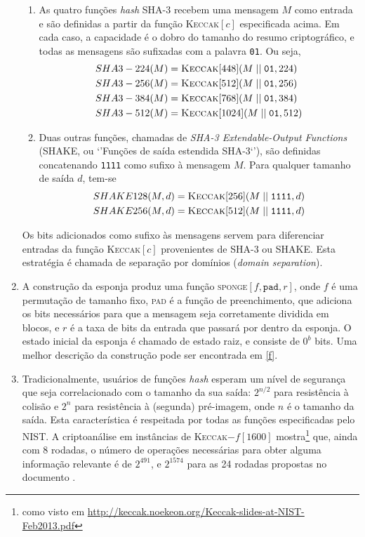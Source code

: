 \documentclass{article}
\begin{document}
\begin{enumerate}[label=(\alph*)]
\begin{enumerate}[label=\roman*.]

\item As quatro funções \emph{hash} SHA-3 recebem uma mensagem $M$ como entrada
e são definidas a partir da função \textsc{Keccak}$[c]$ especificada acima. Em
cada caso, a capacidade é o dobro do tamanho do resumo criptográfico, e todas
as mensagens são sufixadas com a palavra \texttt{01}. Ou seja,
\begin{align*}
    SHA3-224(M) &= \textsc{Keccak}[448](M \mid\mid \texttt{01}, 224) \\
    SHA3-256(M) &= \textsc{Keccak}[512](M \mid\mid \texttt{01}, 256) \\
    SHA3-384(M) &= \textsc{Keccak}[768](M \mid\mid \texttt{01}, 384) \\
    SHA3-512(M) &= \textsc{Keccak}[1024](M \mid\mid \texttt{01}, 512)
\end{align*}

\item Duas outras funções, chamadas de \emph{SHA-3 Extendable-Output Functions}
(SHAKE, ou `'Funções de saída estendida SHA-3`'), são definidas concatenando
\texttt{1111} como sufixo à mensagem $M$. Para qualquer tamanho de saída $d$,
tem-se
\begin{align*}
    SHAKE128(M, d) &= \textsc{Keccak}[256](M \mid\mid \texttt{1111}, d) \\
    SHAKE256(M, d) &= \textsc{Keccak}[512](M \mid\mid \texttt{1111}, d)
\end{align*}

\end{enumerate}

Os bits adicionados como sufixo às mensagens servem para diferenciar entradas
da função \textsc{Keccak}$[c]$ provenientes de SHA-3 ou SHAKE. Esta estratégia
é chamada de separação por domínios (\emph{domain separation}).

\item \label{i} A construção da esponja produz uma função \textsc{sponge}$[f,
\texttt{pad}, r]$, onde $f$ é uma permutação de tamanho fixo, \textsc{pad} é
a função de preenchimento, que adiciona os bits necessários para que a
mensagem seja corretamente dividida em blocos, e $r$ é a taxa de bits da
entrada que passará por dentro da esponja. O estado inicial da esponja é
chamado de estado raiz, e consiste de $0^b$ bits. Uma melhor descrição da
construção pode ser encontrada em \ref{f}.

\item Tradicionalmente, usuários de funções \emph{hash} esperam um nível de
segurança que seja correlacionado com o tamanho da sua saída: $2^{n/2}$ para
resistência à colisão e $2^n$ para resistência à (segunda) pré-imagem, onde
$n$ é o tamanho da saída. Esta característica é respeitada por todas as
funções especificadas pelo NIST. A criptoanálise em instâncias de
\textsc{Keccak}$-f[1600]$ mostra\footnote{como visto em
\url{http://keccak.noekeon.org/Keccak-slides-at-NIST-Feb2013.pdf}} que, ainda
com 8 rodadas, o número de operações necessárias para obter alguma informação
relevante é de $2^{491}$, e $2^{1574}$ para as 24 rodadas propostas no
documento \cite{Dworkin2015}.


\end{enumerate}
\end{document}
